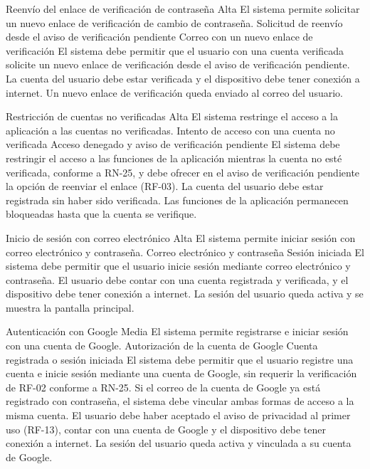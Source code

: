   {Reenvío del enlace de verificación de contraseña}%
  {Alta}%
  {El sistema permite solicitar un nuevo enlace de verificación de cambio de contraseña.}%
  {Solicitud de reenvío desde el aviso de verificación pendiente}%
  {Correo con un nuevo enlace de verificación}%
  {El sistema debe permitir que el usuario con una cuenta verificada solicite un nuevo enlace de verificación desde el aviso de verificación pendiente. }%
  {La cuenta del usuario debe estar verificada y el dispositivo debe tener conexión a internet.}%
  {Un nuevo enlace de verificación queda enviado al correo del usuario.}%

  {Restricción de cuentas no verificadas}%
  {Alta}%
  {El sistema restringe el acceso a la aplicación a las cuentas no verificadas.}%
  {Intento de acceso con una cuenta no verificada}%
  {Acceso denegado y aviso de verificación pendiente}%
  {El sistema debe restringir el acceso a las funciones de la aplicación mientras la cuenta no esté verificada, conforme a RN-25, y debe ofrecer en el aviso de verificación pendiente la opción de reenviar el enlace (RF-03).}%
  {La cuenta del usuario debe estar registrada sin haber sido verificada.}%
  {Las funciones de la aplicación permanecen bloqueadas hasta que la cuenta se verifique.}%

  {Inicio de sesión con correo electrónico}%
  {Alta}%
  {El sistema permite iniciar sesión con correo electrónico y contraseña.}%
  {Correo electrónico y contraseña}%
  {Sesión iniciada}%
  {El sistema debe permitir que el usuario inicie sesión mediante correo electrónico y contraseña.}%
  {El usuario debe contar con una cuenta registrada y verificada, y el dispositivo debe tener conexión a internet.}%
  {La sesión del usuario queda activa y se muestra la pantalla principal.}%

  {Autenticación con Google}%
  {Media}%
  {El sistema permite registrarse e iniciar sesión con una cuenta de Google.}%
  {Autorización de la cuenta de Google}%
  {Cuenta registrada o sesión iniciada}%
  {El sistema debe permitir que el usuario registre una cuenta e inicie sesión mediante una cuenta de Google, sin requerir la verificación de RF-02 conforme a RN-25. Si el correo de la cuenta de Google ya está registrado con contraseña, el sistema debe vincular ambas formas de acceso a la misma cuenta.}%
  {El usuario debe haber aceptado el aviso de privacidad al primer uso (RF-13), contar con una cuenta de Google y el dispositivo debe tener conexión a internet.}%
  {La sesión del usuario queda activa y vinculada a su cuenta de Google.}%

